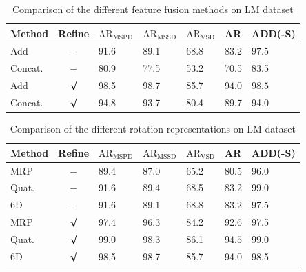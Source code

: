 \documentclass[12pt,DIV14,BCOR12mm,a4paper,footinclude=false,headinclude,parskip=half-,twoside,openright,cleardoublepage=empty,toc=index,bibliography=totoc,listof=totoc]{scrreprt}
\numberwithin{equation}{chapter}
\begin{document}
\begin{table}[H]
  \centering
  \caption{Comparison of the different feature fusion methods on LM dataset}
  \label{tab:ab_fusion_lm}
  \begin{tabular}{l | c | C{16mm} C{16mm} C{16mm}| C{16mm}| C{16mm}}
      \toprule
      Method & Refine & $\text{AR}_{\text{MSPD}}$ & $\text{AR}_{\text{MSSD}}$ & $\text{AR}_{\text{VSD}}$ & AR & ADD(-S) \\
      \midrule
      Add  & $-$ & 91.6 & 89.1 & 68.8 & $\mathbf{83.2}$ & $\mathbf{97.5}$ \\
      Concat. & $-$ & 80.9 & 77.5 & 53.2 & 70.5 & 83.5 \\
      Add  & $\surd $ & 98.5 & 98.7 & 85.7 & $\mathbf{94.0}$ & $\mathbf{98.5}$ \\
      Concat. & $\surd $ & 94.8 & 93.7 & 80.4 & 89.7 & 94.0 \\
      \bottomrule
  \end{tabular}
\end{table}

\begin{table}[H]
  \centering
  \caption{Comparison of the different rotation representations on LM dataset}
  \label{tab:ab_rot_lm}
  \begin{tabular}{l | c | C{16mm} C{16mm} C{16mm}| C{16mm}| C{16mm}}
      \toprule
      Method & Refine & $\text{AR}_{\text{MSPD}}$ & $\text{AR}_{\text{MSSD}}$ & $\text{AR}_{\text{VSD}}$ & AR & ADD(-S) \\
      \midrule
      MRP   & $-$     & 89.4 & 87.0 & 65.2 & 80.5 & 96.0 \\
      Quat. & $-$     & 91.6 & 89.4 & 68.5 & $\mathbf{83.2}$ & $\mathbf{99.0}$ \\
      6D    & $-$     & 91.6 & 89.1 & 68.8 & $\mathbf{83.2}$ & 97.5 \\
      MRP   & $\surd$ & 97.4 & 96.3 & 84.2 & 92.6 & 97.5 \\
      Quat. & $\surd$ & 99.0 & 98.3 & 86.1 & $\mathbf{94.5}$ & $\mathbf{99.0}$ \\
      6D    & $\surd$ & 98.5 & 98.7 & 85.7 & 94.0 & 98.5 \\
      \bottomrule
  \end{tabular}
\end{table}
\end{document}
